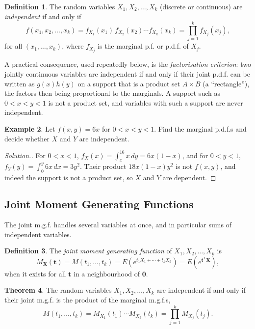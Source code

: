 \documentclass[12pt,a4paper]{report}
\theoremstyle{definition}
\newtheorem{thm}{Theorem}[section]
\newtheorem{definition}[thm]{Definition}
\newtheorem{example}[thm]{Example}
\theoremstyle{plain}
\newenvironment{solution}
  {\renewcommand{\qedsymbol}{}\begin{proof}[\textit{Solution}.]}
  {\end{proof}}
\begin{document}
\begin{definition}
\label{def:independence}
The random variables $X_1,X_2,\dots,X_k$ (discrete or continuous) are
\emph{independent} if and only if
\[f(x_1,x_2,\dots,x_k) = f_{X_1}(x_1)\, f_{X_2}(x_2)\cdots f_{X_k}(x_k) =
\prod^k_{j=1} f_{X_j} (x_j) ,\]
for all $(x_1,\dots,x_k)$, where $f_{X_j}$ is the marginal p.f. or p.d.f. of
$X_j$.
\end{definition}

A practical consequence, used repeatedly below, is the \emph{factorisation
criterion}: two jointly continuous variables are independent if and only if
their joint p.d.f. can be written as $g(x)h(y)$ on a support that is a product
set $A\times B$ (a ``rectangle''), the factors then being proportional to the
marginals. A support such as $0<x<y<1$ is not a product set, and variables with
such a support are never independent.

\begin{example}
\label{ex:marginals}
Let $f(x,y) = 6x$ for $0<x<y<1$. Find the marginal p.d.f.s and decide whether
$X$ and $Y$ are independent.
\end{example}

\begin{solution}
For $0<x<1$, $f_X(x) = \int_x^16x\,dy = 6x(1 - x)$, and for $0<y<1$,
$f_Y(y) = \int_0^y6x\,dx = 3y^2$. Their product $18x(1 - x)y^2$ is not
$f(x,y)$, and indeed the support is not a product set, so $X$ and $Y$ are
dependent.
\end{solution}

\subsection{Joint Moment Generating Functions}

The joint m.g.f. handles several variables at once, and in particular sums of
independent variables.

\begin{definition}
\label{def:jointmgf}
The \emph{joint moment generating function} of $X_1, X_2 , \dots,X_k$ is
\[M_{\mathbf X}(\mathbf t) = M(t_1,\dots,t_k) = E\left(e^{t_1X_1 + \cdots +
t_kX_k}\right) = E\left(e^{\mathbf t^{\mathsf T}\mathbf X}\right),\]
when it exists for all $\mathbf t$ in a neighbourhood of $\mathbf 0$.
\end{definition}

\begin{thm}
\label{thm:jointmgfindep}
The random variables $X_1,X_2,\dots,X_k$ are independent if and only if their
joint m.g.f. is the product of the marginal m.g.f.s,
\[M(t_1,\dots, t_k) = M_{X_1}(t_1)\cdots M_{X_k}(t_k) = \prod^k_{j=1}
M_{X_j}(t_j).\]
\end{thm}
\end{document}
